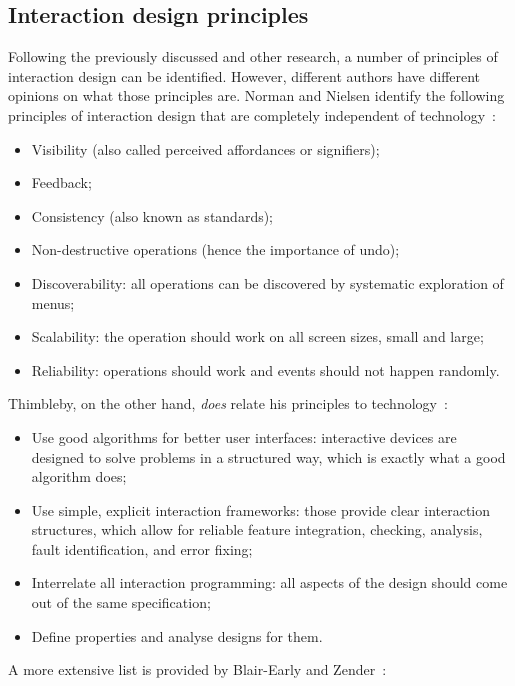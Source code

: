 \subsection[Principles]{Interaction design principles}
Following the previously discussed and other research, a number of principles of interaction design can be identified. However, different authors have different opinions on what those principles are. Norman and Nielsen identify the following principles of interaction design that are completely independent of technology~\cite{norman2010gestural}:
\begin{itemize}[noitemsep,topsep=0pt,parsep=0pt,partopsep=0pt]
\item Visibility (also called perceived affordances or signifiers);
\item Feedback;
\item Consistency (also known as standards);
\item Non-destructive operations (hence the importance of undo);
\item Discoverability: all operations can be discovered by systematic exploration of menus;
\item Scalability: the operation should work on all screen sizes, small and large;
\item Reliability: operations should work and events should not happen randomly.
\end{itemize}
Thimbleby, on the other hand, \emph{does} relate his principles to technology~\cite{thimbleby2007press}:
\begin{itemize}[noitemsep,topsep=0pt,parsep=0pt,partopsep=0pt]
\item Use good algorithms for better user interfaces: interactive devices are designed to solve problems in a structured way, which is exactly what a good algorithm does;
\item Use simple, explicit interaction frameworks: those provide clear interaction structures, which allow for reliable feature integration, checking, analysis, fault identification, and error fixing;
\item Interrelate all interaction programming: all aspects of the design should come out of the same specification;
\item Define properties and analyse designs for them.
\end{itemize}
A more extensive list is provided by Blair-Early and Zender~\cite{blair2008user}:
